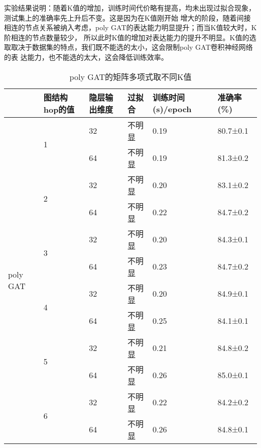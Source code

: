  实验结果说明：随着K值的增加，训练时间代价略有提高，均未出现过拟合现象，测试集上的准确率先上升后不变。这是因为在K值刚开始
 增大的阶段，随着间接相连的节点关系被纳入考虑，poly GAT的表达能力明显提升；而当K值较大时，K阶相连的节点数量较少，
 所以此时K值的增加对表达能力的提升不明显。K值的选取取决于数据集的特点，我们既不能选的太小，这会限制poly GAT卷积神经网络的表
 达能力，也不能选的太大，这会降低训练效率。

 \begin{table}[htbp]
    \centering
    \caption{poly GAT的矩阵多项式取不同K值}
    \label{tabel4-4}
    \begin{tabular}{|l|l|l|l|l|l|}
    \hline
                             & 图结构hop的值      & 隐层输出维度 & 过拟合 & 训练时间(s)/epoch & 准确率(\%) \\ \hline
    \multirow{12}{*}{poly GAT}& \multirow{2}{*}{1} & 32     & 不明显      & 0.19           & 80.7±0.1    \\ \cline{3-6} 
                             &                    & 64     & 不明显      & 0.19           & 81.3±0.2    \\ \cline{2-6} 
                             & \multirow{2}{*}{2} & 32     & 不明显      & 0.20           & 83.1±0.2    \\ \cline{3-6} 
                             &                    & 64     & 不明显      & 0.22           & 84.7±0.2    \\ \cline{2-6} 
                             & \multirow{2}{*}{3} & 32     & 不明显      & 0.20           & 84.3±0.1    \\ \cline{3-6} 
                             &                    & 64     & 不明显      & 0.23           & 84.7±0.2    \\ \cline{2-6}
                             & \multirow{2}{*}{4} & 32     & 不明显      & 0.20           & 84.9±0.1    \\ \cline{3-6} 
                             &                    & 64     & 不明显      & 0.25           & 84.1±0.1    \\ \cline{2-6} 
                             & \multirow{2}{*}{5} & 32     & 不明显      & 0.21           & 84.8±0.2    \\ \cline{3-6} 
                             &                    & 64     & 不明显      & 0.26           & 85.0±0.1    \\ \cline{2-6}  
                             & \multirow{2}{*}{6} & 32     & 不明显      & 0.22           & 84.2±0.2    \\ \cline{3-6} 
                             &                    & 64     & 不明显      & 0.26           & 84.8±0.1    \\ \hline
    \end{tabular}
    \end{table}